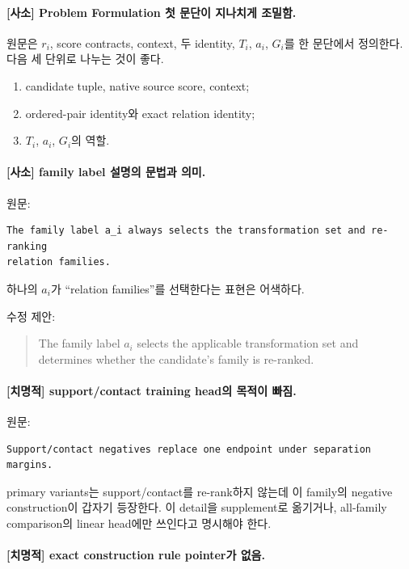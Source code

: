 \documentclass[11pt]{article}
\newcommand{\fatal}{\textbf{\textcolor{fatalred}{[치명적]}}}
\newcommand{\minor}{\textbf{\textcolor{minorblue}{[사소]}}}
\begin{document}
\paragraph{\minor{} Problem Formulation 첫 문단이 지나치게 조밀함.}

원문은 $r_i$, score contracts, context, 두 identity, $T_i$, $a_i$, $G_i$를 한
문단에서 정의한다. 다음 세 단위로 나누는 것이 좋다.

\begin{enumerate}[leftmargin=2em]
    \item candidate tuple, native source score, context;
    \item ordered-pair identity와 exact relation identity;
    \item $T_i$, $a_i$, $G_i$의 역할.
\end{enumerate}

\paragraph{\minor{} family label 설명의 문법과 의미.}

원문:
\begin{verbatim}
The family label a_i always selects the transformation set and re-ranking
relation families.
\end{verbatim}

하나의 $a_i$가 ``relation families''를 선택한다는 표현은 어색하다.

수정 제안:
\begin{quote}
The family label $a_i$ selects the applicable transformation set and determines
whether the candidate's family is re-ranked.
\end{quote}

\paragraph{\fatal{} support/contact training head의 목적이 빠짐.}

원문:
\begin{verbatim}
Support/contact negatives replace one endpoint under separation margins.
\end{verbatim}

primary variants는 support/contact를 re-rank하지 않는데 이 family의 negative
construction이 갑자기 등장한다. 이 detail을 supplement로 옮기거나, all-family
comparison의 linear head에만 쓰인다고 명시해야 한다.

\paragraph{\fatal{} exact construction rule pointer가 없음.}
\end{document}
